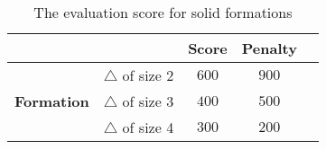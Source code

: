 \begin{table}[ht]
\centering
	\begin{tabular}{llccc}
		\cline{3-4}
		\multicolumn{1}{c}{} & \multicolumn{1}{c}{\normalsize } & \multicolumn{1}{|c}{\normalsize Score} & \multicolumn{1}{c|}{\normalsize Penalty} \\
		\hline
		\multicolumn{1}{|c|}{\multirow{3}{*}{\textbf{\normalsize Formation}}} & \multicolumn{1}{c}{\normalsize $\triangle$ of size 2} & \multicolumn{1}{|c}{$600$} & \multicolumn{1}{c|}{\normalsize $900$} \\
		\multicolumn{1}{|c|}{} & \multicolumn{1}{c}{\normalsize $\triangle$ of size 3} & \multicolumn{1}{|c}{$400$} & \multicolumn{1}{c|}{\normalsize $500$} \\
		\multicolumn{1}{|c|}{} & \multicolumn{1}{c}{\normalsize $\triangle$ of size 4} & \multicolumn{1}{|c}{$300$} & \multicolumn{1}{c|}{\normalsize $200$} \\
		\hline
	\end{tabular}
	\caption{The evaluation score for solid formations}
	\label{tab:evaluationsolidformations}
\end{table}